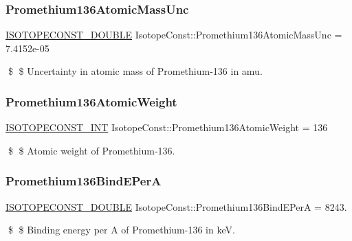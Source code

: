 \subsubsection{\texorpdfstring{Promethium136\+Atomic\+Mass\+Unc}{Promethium136AtomicMassUnc}}
{\footnotesize\ttfamily \mbox{\hyperlink{group___isotope_const-_macros_ga8f45a7272ce02c0b4c65c44636ed719a}{I\+S\+O\+T\+O\+P\+E\+C\+O\+N\+S\+T\+\_\+\+D\+O\+U\+B\+LE}} Isotope\+Const\+::\+Promethium136\+Atomic\+Mass\+Unc = 7.\+4152e-\/05}

\$ \$ Uncertainty in atomic mass of Promethium-\/136 in amu. \mbox{\label{group___isotope_const-_promethium-_pm136_ga7025aaa25e17603bf6fafdcc4e6ea458}} 
\subsubsection{\texorpdfstring{Promethium136\+Atomic\+Weight}{Promethium136AtomicWeight}}
{\footnotesize\ttfamily \mbox{\hyperlink{group___isotope_const-_macros_ga5f18360b3e99483a35c32d789e62621c}{I\+S\+O\+T\+O\+P\+E\+C\+O\+N\+S\+T\+\_\+\+I\+NT}} Isotope\+Const\+::\+Promethium136\+Atomic\+Weight = 136}

\$ \$ Atomic weight of Promethium-\/136. \mbox{\label{group___isotope_const-_promethium-_pm136_ga43c4efc0d28287b5f6b6ce3211077e5d}} 
\subsubsection{\texorpdfstring{Promethium136\+Bind\+E\+PerA}{Promethium136BindEPerA}}
{\footnotesize\ttfamily \mbox{\hyperlink{group___isotope_const-_macros_ga8f45a7272ce02c0b4c65c44636ed719a}{I\+S\+O\+T\+O\+P\+E\+C\+O\+N\+S\+T\+\_\+\+D\+O\+U\+B\+LE}} Isotope\+Const\+::\+Promethium136\+Bind\+E\+PerA = 8243.}

\$ \$ Binding energy per A of Promethium-\/136 in keV. \mbox{\label{group___isotope_const-_promethium-_pm136_ga5e7644a17e346bbcad67beab40278baa}} 

